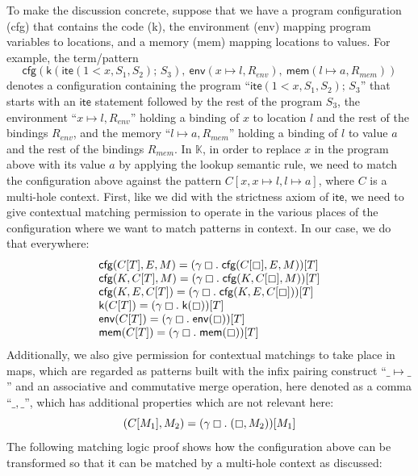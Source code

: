 \documentclass[UTF8,11pt]{article}
\theoremstyle{plain}
\theoremstyle{definition}
\theoremstyle{remark}
\newcommand{\K}{\mbox{$\mathbb{K}$}\xspace}
\newcommand{\hole}{\boxempty}
\newcommand{\ite}{\textsf{ite}}
\begin{document}
To make the discussion concrete, suppose that we have a program configuration
(\textsf{cfg}) that contains the code (\textsf{k}), the environment
(\textsf{env}) mapping program variables to locations,
and a memory (\textsf{mem}) mapping locations to values.
For example, the term/pattern
$$
\textsf{cfg}
(
\textsf{k}(\ite(1 < x,S_1,S_2)\textsf{;\ }S_3),
\ \textsf{env}(x \mapsto l, R_\textit{env})
,
\ \textsf{mem}(l \mapsto a, R_\textit{mem})
)
$$
denotes a configuration containing the program
``$\ite(1 < x,S_1,S_2)\textsf{;\ }S_3$''
that starts with an $\ite$ statement followed by the rest of the program $S_3$,
the environment ``$x \mapsto l, R_\textit{env}$'' holding a binding
of $x$ to location $l$ and the rest of the bindings $R_\textit{env}$,
and the memory ``$l \mapsto a, R_\textit{mem}$'' holding a binding
of $l$ to value $a$ and the rest of the bindings $R_\textit{mem}$.
In \K, in order to replace $x$ in the program above with its value $a$ by
applying the lookup semantic rule, we need to match the configuration above
against the pattern $C[x,x\mapsto l,l\mapsto a]$, where $C$ is a multi-hole
context.
First, like we did with the strictness axiom of $\ite$, we need to give
contextual matching permission to operate in the various places of the
configuration where we want to match patterns in context.
In our case, we do that everywhere:
$$
\begin{array}{l}
\textsf{cfg}(C[T],E,M) = (\gamma\hole.\;\textsf{cfg}(C[\hole],E,M))[T]
\\
\textsf{cfg}(K,C[T],M) = (\gamma\hole.\;\textsf{cfg}(K,C[\hole],M))[T]
\\
\textsf{cfg}(K,E,C[T]) = (\gamma\hole.\;\textsf{cfg}(K,E,C[\hole]))[T]
\\
\textsf{k}(C[T]) = (\gamma\hole.\;\textsf{k}(\hole))[T]
\\
\textsf{env}(C[T]) = (\gamma\hole.\;\textsf{env}(\hole))[T]
\\
\textsf{mem}(C[T]) = (\gamma\hole.\;\textsf{mem}(\hole))[T]
\end{array}
$$
Additionally, we also give permission for contextual matchings to
take place in maps, which are regarded as patterns built with
the infix pairing construct ``$\_\mapsto\_$'' and an associative and
commutative merge operation, here denoted as a comma ``$\_,\_$'', which
has additional properties which are not relevant here:
$$
(C[M_1],M_2) = (\gamma\hole.\;(\hole,M_2))[M_1]
$$
The following matching logic proof shows how the configuration above
can be transformed so that it can be matched by a multi-hole context
as discussed:
\end{document}
